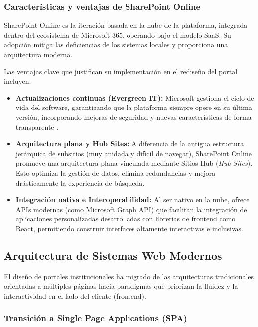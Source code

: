 \subsubsection*{Características y ventajas de SharePoint Online}

SharePoint Online es la iteración basada en la nube de la plataforma, integrada dentro del ecosistema de Microsoft 365, operando bajo el modelo SaaS. Su adopción mitiga las deficiencias de los sistemas locales y proporciona una arquitectura moderna.

Las ventajas clave que justifican su implementación en el rediseño del portal incluyen:
\begin{itemize}
    \item \textbf{Actualizaciones continuas (Evergreen IT):} Microsoft gestiona el ciclo de vida del software, garantizando que la plataforma siempre opere en su última versión, incorporando mejoras de seguridad y nuevas características de forma transparente \cite{microsoft2018modernizing}.
    \item \textbf{Arquitectura plana y Hub Sites:} A diferencia de la antigua estructura jerárquica de subsitios (muy anidada y difícil de navegar), SharePoint Online promueve una arquitectura plana vinculada mediante Sitios Hub (\textit{Hub Sites}). Esto optimiza la gestión de datos, elimina redundancias y mejora drásticamente la experiencia de búsqueda.
    \item \textbf{Integración nativa e Interoperabilidad:} Al ser nativo en la nube, ofrece APIs modernas (como Microsoft Graph API) que facilitan la integración de aplicaciones personalizadas desarrolladas con librerías de frontend como React, permitiendo construir interfaces altamente interactivas e inclusivas.
\end{itemize}

\subsection{Arquitectura de Sistemas Web Modernos}
\label{sec:arquitectura_web_moderna}

El diseño de portales institucionales ha migrado de las arquitecturas tradicionales orientadas a múltiples páginas hacia paradigmas que priorizan la fluidez y la interactividad en el lado del cliente (frontend).

\subsubsection*{Transición a Single Page Applications (SPA)}

